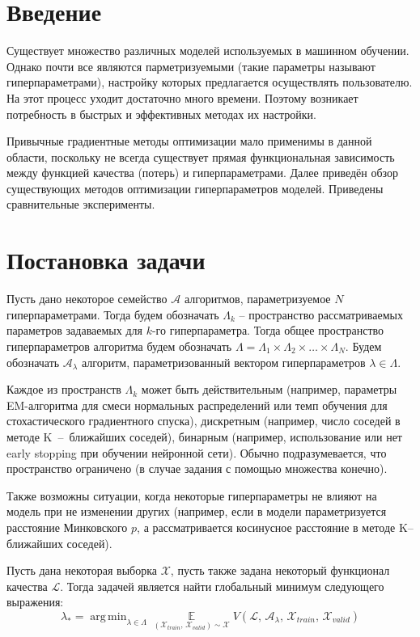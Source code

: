 \documentclass[12pt,fleqn]{article}
\DeclareMathOperator*{\argmin}{arg\,min}
\DeclareMathOperator*{\E}{\mathbb{E}}
\begin{document}
\newpage
\section{Введение}

    Существует множество различных моделей используемых в машинном обучении. Однако почти все являются парметризуемыми (такие параметры называют гиперпараметрами), настройку которых предлагается осуществлять пользователю. На этот процесс уходит достаточно много времени.
    Поэтому возникает потребность в быстрых и эффективных методах их настройки.
    
    
    Привычные градиентные методы оптимизации мало применимы в данной области, поскольку не всегда существует прямая функциональная зависимость между функцией качества (потерь) и гиперпараметрами.
    Далее приведён обзор существующих методов оптимизации гиперпараметров моделей. Приведены сравнительные эксперименты. 
    
    
    
\section{Постановка задачи}

Пусть дано некоторое семейство $\mathcal{A}$ алгоритмов, параметризуемое $N$ гиперпараметрами. Тогда будем обозначать $\Lambda_k$ -- пространство рассматриваемых параметров задаваемых для $k$-го гиперпараметра. Тогда общее пространство гиперпараметров алгоритма будем обозначать $\Lambda = \Lambda_1 \times \Lambda_2 \times \dots \times \Lambda_N$. Будем обозначать $\mathcal{A}_\lambda$ алгоритм, параметризованный вектором гиперпараметров $\lambda \in \Lambda$. 

Каждое из пространств $\Lambda_k$ может быть действительным (например, параметры EM-алгоритма для смеси нормальных распределений или темп обучения для стохастического градиентного спуска), дискретным (например, число соседей в методе K~--~ближайших соседей), бинарным (например, использование или нет early stopping при обучении нейронной сети). Обычно подразумевается, что пространство ограничено (в случае задания с помощью множества конечно). 

Также возможны ситуации, когда некоторые гиперпараметры не влияют на модель при не изменении других (например, если в модели параметризуется расстояние Минковского $p$, а рассматривается косинусное расстояние в методе K--ближайших соседей). 

\newpage

Пусть дана некоторая выборка $\mathcal{X}$, пусть также задана некоторый функционал качества $\mathcal{L}$. Тогда задачей является найти глобальный минимум следующего выражения:
$$\lambda_{*} = \argmin_{\lambda \in \Lambda} \underset{(\mathcal{X}_{train},\, \mathcal{X}_{valid}) \sim \mathcal{X}}{\E} V(\mathcal{L},\, \mathcal{A}_{\lambda},\, \mathcal{X}_{train},\, \mathcal{X}_{valid})$$
\end{document}
